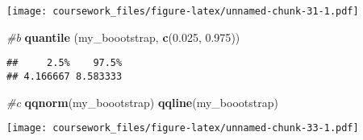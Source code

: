 \documentclass[
]{article}
\newenvironment{Shaded}{\begin{snugshade}}{\end{snugshade}}
\newcommand{\CommentTok}[1]{\textcolor[rgb]{0.56,0.35,0.01}{\textit{#1}}}
\newcommand{\FloatTok}[1]{\textcolor[rgb]{0.00,0.00,0.81}{#1}}
\newcommand{\FunctionTok}[1]{\textcolor[rgb]{0.13,0.29,0.53}{\textbf{#1}}}
\newcommand{\NormalTok}[1]{#1}
\begin{document}
\texttt{[image: coursework\_files/figure-latex/unnamed-chunk-31-1.pdf]}

\begin{Shaded}
\begin{Highlighting}[]
\CommentTok{\#b}
\FunctionTok{quantile}\NormalTok{ (my\_boootstrap, }\FunctionTok{c}\NormalTok{(}\FloatTok{0.025}\NormalTok{, }\FloatTok{0.975}\NormalTok{))}
\end{Highlighting}
\end{Shaded}

\begin{verbatim}
##     2.5%    97.5% 
## 4.166667 8.583333
\end{verbatim}

\begin{Shaded}
\begin{Highlighting}[]
\CommentTok{\#c}
\FunctionTok{qqnorm}\NormalTok{(my\_boootstrap)}
\FunctionTok{qqline}\NormalTok{(my\_boootstrap)}
\end{Highlighting}
\end{Shaded}

\texttt{[image: coursework\_files/figure-latex/unnamed-chunk-33-1.pdf]}
\end{document}
